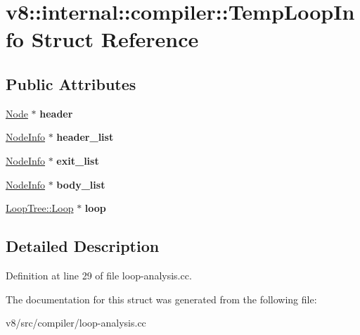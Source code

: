 \hypertarget{structv8_1_1internal_1_1compiler_1_1TempLoopInfo}{}\section{v8\+:\+:internal\+:\+:compiler\+:\+:Temp\+Loop\+Info Struct Reference}
\label{structv8_1_1internal_1_1compiler_1_1TempLoopInfo}
\subsection*{Public Attributes}
\begin{DoxyCompactItemize}
\item 
\mbox{\label{structv8_1_1internal_1_1compiler_1_1TempLoopInfo_acc2563f1eb0d161818fae149ea3ff612}} 
\mbox{\hyperlink{classv8_1_1internal_1_1compiler_1_1Node}{Node}} $\ast$ {\bfseries header}
\item 
\mbox{\label{structv8_1_1internal_1_1compiler_1_1TempLoopInfo_a105630e50ff27221194fc06d9e8b1333}} 
\mbox{\hyperlink{structv8_1_1internal_1_1compiler_1_1NodeInfo}{Node\+Info}} $\ast$ {\bfseries header\+\_\+list}
\item 
\mbox{\label{structv8_1_1internal_1_1compiler_1_1TempLoopInfo_a2eaaf68a834ce3114340348f91b4e1e5}} 
\mbox{\hyperlink{structv8_1_1internal_1_1compiler_1_1NodeInfo}{Node\+Info}} $\ast$ {\bfseries exit\+\_\+list}
\item 
\mbox{\label{structv8_1_1internal_1_1compiler_1_1TempLoopInfo_a563e033be27c76998582b02f8398823e}} 
\mbox{\hyperlink{structv8_1_1internal_1_1compiler_1_1NodeInfo}{Node\+Info}} $\ast$ {\bfseries body\+\_\+list}
\item 
\mbox{\label{structv8_1_1internal_1_1compiler_1_1TempLoopInfo_a147eb5066a510d1f2a37294a01413161}} 
\mbox{\hyperlink{classv8_1_1internal_1_1compiler_1_1LoopTree_1_1Loop}{Loop\+Tree\+::\+Loop}} $\ast$ {\bfseries loop}
\end{DoxyCompactItemize}


\subsection{Detailed Description}


Definition at line 29 of file loop-\/analysis.\+cc.



The documentation for this struct was generated from the following file\+:\begin{DoxyCompactItemize}
\item 
v8/src/compiler/loop-\/analysis.\+cc\end{DoxyCompactItemize}

